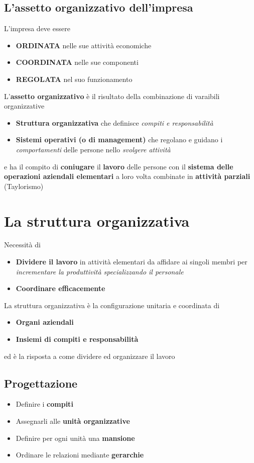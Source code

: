 \documentclass[12pt]{article}
\begin{document}
\subsection{L'assetto organizzativo dell'impresa}
L'impresa deve essere
\begin{itemize}
    \item \textbf{ORDINATA} nelle sue attività economiche
    \item \textbf{COORDINATA} nelle sue componenti
    \item \textbf{REGOLATA} nel suo funzionamento
\end{itemize}
L'\textbf{assetto organizzativo} è il risultato della combinazione di varaibili organizzative
\begin{itemize}
    \item \textbf{Struttura organizzativa} che definisce \textit{compiti e responsabilità}
    \item \textbf{Sistemi operativi (o di management)} che regolano e guidano i \textit{comportamenti} delle persone nello \textit{svolgere attività}
\end{itemize}
e ha il compito di \textbf{coniugare} il \textbf{lavoro} delle persone con il \textbf{sistema delle operazioni aziendali elementari} a loro volta combinate in \textbf{attività parziali} (Taylorismo)
\newpage
\section{La struttura organizzativa}
Necessità di
\begin{itemize}
    \item \textbf{Dividere il lavoro} in attività elementari da affidare ai singoli membri per \textit{incrementare la produttività specializzando il personale}
    \item \textbf{Coordinare efficacemente}
\end{itemize}
La struttura organizzativa è la configurazione unitaria e coordinata di
\begin{itemize}
    \item \textbf{Organi aziendali}
    \item \textbf{Insiemi di compiti e responsabilità}
\end{itemize}
ed è la risposta a come dividere ed organizzare il lavoro
\subsection{Progettazione}
\begin{itemize}
    \item Definire i \textbf{compiti}
    \item Assegnarli alle \textbf{unità organizzative}
    \item Definire per ogni unità una \textbf{mansione}
    \item Ordinare le relazioni mediante \textbf{gerarchie}
\end{itemize}
\end{document}
